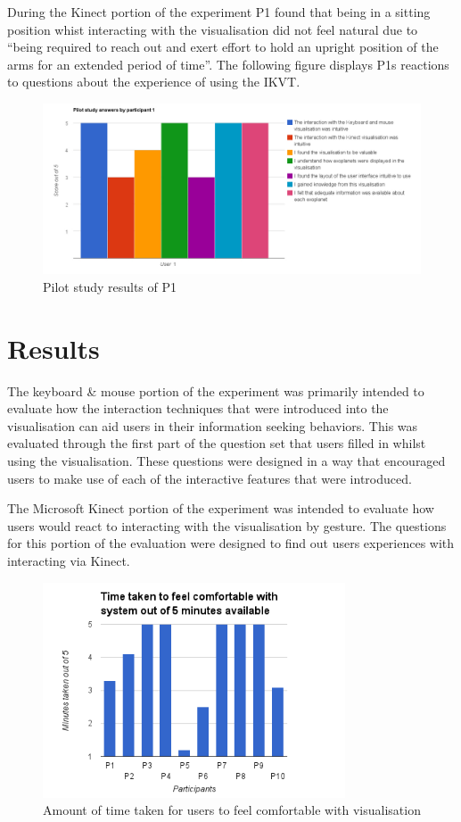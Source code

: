During the Kinect portion of the experiment P1 found that being in a sitting
position whist interacting with the visualisation did not feel natural due to
``being required to reach out and exert effort to hold an upright position of
the arms for an extended period of time''. The following figure displays P1s
reactions to questions about the experience of using the IKVT.
\begin{figure}[H]
  \centering
      \includegraphics[width=1\textwidth]{images/pilot.jpg}
  \caption{Pilot study results of P1}  
    \label{fig:pilot}
\end{figure}





\section{Results}
The keyboard \& mouse portion of the experiment was primarily intended to
evaluate how the interaction techniques that were introduced into the
visualisation can aid users in their information seeking behaviors.
This was evaluated through the first part of the question set that users filled
in whilst using the visualisation. These questions were designed in a way that
encouraged users to make use of each of the interactive features that were
introduced.

The Microsoft Kinect portion of the experiment was intended to evaluate how
users would react to interacting with the visualisation by gesture. The
questions for this portion of the evaluation were designed to find out users
experiences with interacting via Kinect.

\begin{figure}[H]
  \centering
      \includegraphics[width=0.8\textwidth]{images/timeTaken.png}
  \caption{Amount of time taken for users to feel comfortable with
visualisation}  
\end{figure}


